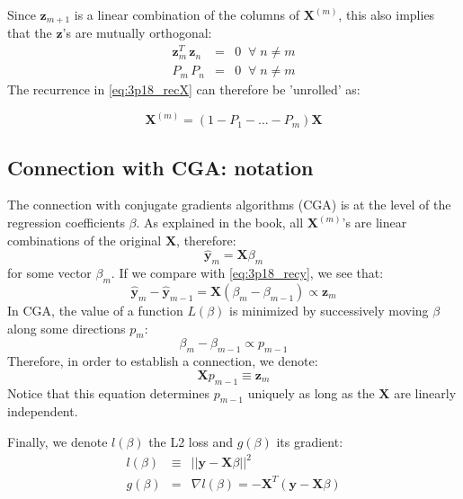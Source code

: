 Since $\mathbf{z}_{m + 1}$ is a linear combination of the columns of
$\mathbf{X}^{(m)}$, this also implies that the $\mathbf{z}$'s are mutually
orthogonal:
\begin{eqnarray*}
    \mathbf{z}_m^T \, \mathbf{z}_n & = & 0 \;\; \forall\; n \neq m\\
    P_m \, P_n & = & 0  \;\; \forall\; n \neq m    
\end{eqnarray*}
The recurrence in \eqref{eq:3p18_recX} can therefore be 'unrolled' as:

\begin{equation}
\mathbf{X}^{(m)} = \left(1 - P_1 - \ldots - P_m\right) \mathbf{X}
\end{equation}

\subsection*{Connection with CGA: notation}
The connection with conjugate gradients algorithms (CGA) is at the level
of the regression coefficients $\beta$. As explained in the book,
all $\mathbf{X}^{(m)}$'s are linear combinations of the original $\mathbf{X}$, therefore:
\begin{equation}
\hat{\mathbf{y}}_m = \mathbf{X}\beta_m
\end{equation}
for some vector $\beta_m$. If we compare with \eqref{eq:3p18_recy},
we see that:
\begin{equation*}
\hat{\mathbf{y}}_m - \hat{\mathbf{y}}_{m - 1} = 
    \mathbf{X} \left(\beta_m - \beta_{m - 1}\right) \propto
    \mathbf{z}_m
\end{equation*}
In CGA, the value of a function $L(\beta)$ is minimized by
successively moving $\beta$ along some directions $p_m$:
\begin{equation*}
\beta_m - \beta_{m - 1} \propto p_{m - 1}
\end{equation*}
Therefore, in order to establish a connection, we denote:
\begin{equation}\label{eq:e3p18_p}
\mathbf{X} p_{m - 1} \equiv \mathbf{z}_m
\end{equation}
Notice that this equation determines $p_{m - 1}$ uniquely
as long as the $\mathbf{X}$ are linearly independent.

Finally, we denote $l(\beta)$ the L2 loss and $g(\beta)$ its gradient:
\begin{eqnarray*}
    l(\beta) & \equiv & ||\mathbf{y} - \mathbf{X} \beta ||^2 \\
    g(\beta) & = & \nabla l(\beta) = - \mathbf{X}^T \left(\mathbf{y}
        - \mathbf{X} \beta \right)
\end{eqnarray*}

